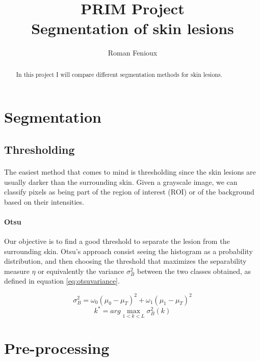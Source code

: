 \documentclass[a4paper,10pt]{article}
\title{PRIM Project\\ Segmentation of skin lesions}
\author{Roman Fenioux}
\begin{document}
\maketitle
\newpage
\begin{abstract}
In this project I will compare different segmentation methods for skin lesions. 
\end{abstract}

\section{Segmentation}
\subsection{Thresholding}
\paragraph{}
The easiest method that comes to mind is thresholding since the skin lesions are usually darker than the surrounding skin. Given a grayscale image, we can classify pixels as being part of the region of interest (ROI) or of the background based on their intensities.
\paragraph{Otsu~\cite{Otsu1979}}
Our objective is to find a good threshold to separate the lesion from the surrounding skin. Otsu's approach consist seeing the histogram as a probability distribution, and then choosing the threshold that maximizes the separability measure $\eta$ or equivalently the variance $\sigma_B^2$ between the two classes obtained, as defined in equation \ref{eq:otsuvariance}.

\begin{equation} \label{eq:otsuvariance}
  \sigma_B^2 = \omega_0 (\mu_0 - \mu_T)^2 + \omega_1 (\mu_1 - \mu_T)^2 
\end{equation}
\begin{equation} \label{eq:optimthresh}
  k^* = arg\max_{1<k<L} \sigma_B^2(k)   
\end{equation}



\section{Pre-processing}
\end{document}

